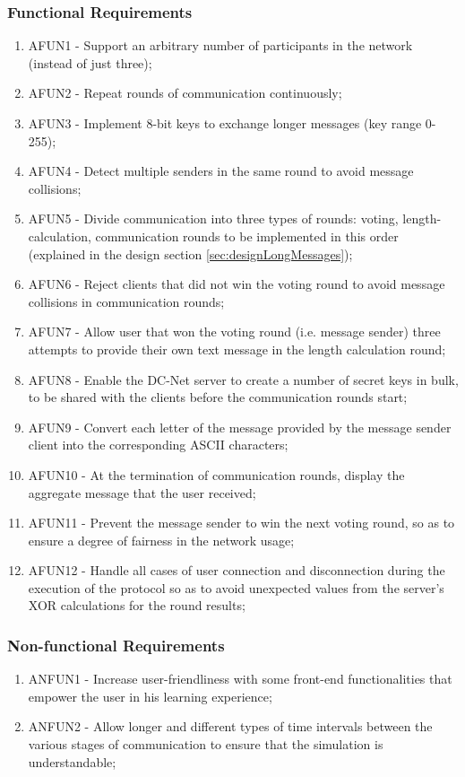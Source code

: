 \subsubsection{Functional Requirements}
\begin{enumerate}
    \item AFUN1 - Support an arbitrary number of participants in the network (instead of just three);
    \item AFUN2 - Repeat rounds of communication continuously;
    \item AFUN3 - Implement 8-bit keys to exchange longer messages (key range 0-255);
    \item AFUN4 - Detect multiple senders in the same round to avoid message collisions;
    \item AFUN5 - Divide communication into three types of rounds: voting, length-calculation, communication rounds to be implemented in this order (explained in the design section \ref{sec:designLongMessages});
    \item AFUN6 - Reject clients that did not win the voting round to avoid message collisions in communication rounds;
    \item AFUN7 - Allow user that won the voting round (i.e. message sender) three attempts to provide their own text message in the length calculation round;
    \item AFUN8 - Enable the DC-Net server to create a number of secret keys in bulk, to be shared with the clients before the communication rounds start;
    \item AFUN9 - Convert each letter of the message provided by the message sender client into the corresponding ASCII characters;
    \item AFUN10 - At the termination of communication rounds, display the aggregate message that the user received;
    \item AFUN11 - Prevent the message sender to win the next voting round, so as to ensure a degree of fairness in the network usage;
    \item AFUN12 - Handle all cases of user connection and disconnection during the execution of the protocol so as to avoid unexpected values from the server's XOR calculations for the round results;
\end{enumerate}

\subsubsection{Non-functional Requirements}
\begin{enumerate}
    \item ANFUN1 - Increase user-friendliness with some front-end functionalities that empower the user in his learning experience;
    \item ANFUN2 - Allow longer and different types of time intervals between the various stages of communication to ensure that the simulation is understandable;
\end{enumerate}

